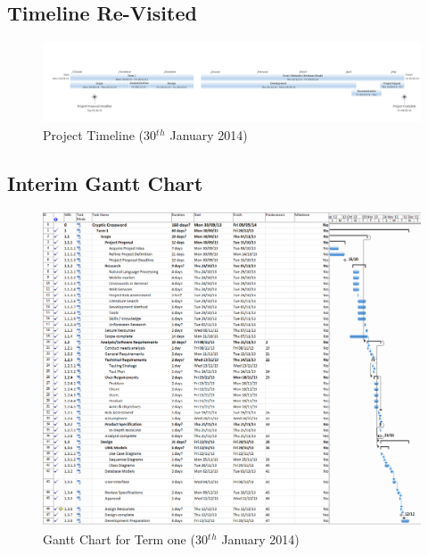 \begin{landscape}
\subsection{Timeline Re-Visited}

\begin{figure}[H]
  \centering
  \includegraphics[width=\linewidth]{images/timeline2.png}
  \caption{Project Timeline (30$^t$$^h$ January 2014)}
  \label{fig:timeline2}
\end{figure}


\newpage 
\subsection{Interim Gantt Chart}

\begin{figure}[H]
  \centering
  \includegraphics[scale=0.35]{images/gant_chart_interim_term1.png}
  \caption{Gantt Chart for Term one (30$^t$$^h$ January 2014)}
  \label{fig:ganttinterimterm1}
\end{figure}


\end{landscape}
